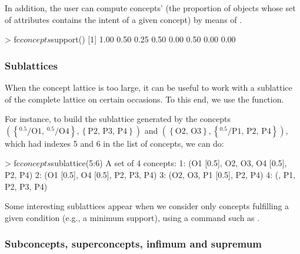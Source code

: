 
In addition, the user can compute concepts'  (the
proportion of objects whose set of attributes contains the intent of a
given concept) by means of .

\begin{example}
> fc$concepts$support()
[1] 1.00 0.50 0.25 0.50 0.00 0.50 0.00 0.00
\end{example}

\hypertarget{sublattices}{%
\subsubsection{Sublattices}\label{sublattices}}

When the concept lattice is too large, it can be useful to work with a
sublattice of the complete lattice on certain occasions. To this end, we
use the  function.

For instance, to build the sublattice generated by the concepts
\(\ensuremath{\left(\ensuremath{\left\{{^{0.5}}\!/\mathrm{O1},\, {^{0.5}}\!/\mathrm{O4}\right\}}, \ensuremath{\left\{\mathrm{P2},\, \mathrm{P3},\, \mathrm{P4}\right\}}\right)}\)
and
\(\ensuremath{\left(\ensuremath{\left\{\mathrm{O2},\, \mathrm{O3}\right\}}, \ensuremath{\left\{{^{0.5}}\!/\mathrm{P1},\, \mathrm{P2},\, \mathrm{P4}\right\}}\right)}\),
which had indexes 5 and 6 in the list of concepts, we can do:

\begin{example}
> fc$concepts$sublattice(5:6)
A set of 4 concepts:
1: ({O1 [0.5], O2, O3, O4 [0.5]}, {P2, P4})
2: ({O1 [0.5], O4 [0.5]}, {P2, P3, P4})
3: ({O2, O3}, {P1 [0.5], P2, P4})
4: ({}, {P1, P2, P3, P4})
\end{example}

Some interesting sublattices appear when we consider only concepts
fulfilling a given condition (e.g., a minimum support), using a command
such as .

\hypertarget{subconcepts-superconcepts-infimum-and-supremum}{%
\subsubsection{Subconcepts, superconcepts, infimum and
supremum}\label{subconcepts-superconcepts-infimum-and-supremum}}

